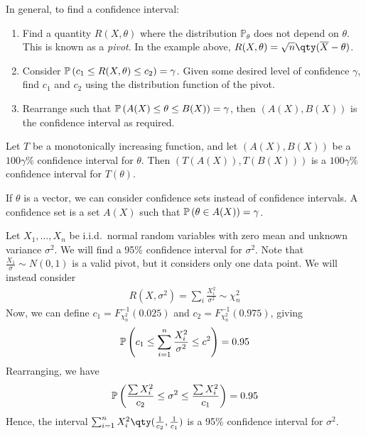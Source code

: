 \begin{remark}
	In general, to find a confidence interval:
	\begin{enumerate}
		\item Find a quantity $R(X,\theta)$ where the distribution $\mathbb P_\theta$ does not depend on $\theta$.
		      This is known as a \textit{pivot}.
		      In the example above, $R(X,\theta) = \sqrt{n}\qty(\overline X - \theta)$.
		\item Consider $\mathbb{P}\left({c_1 \leq R(X,\theta) \leq c_2}\right) = \gamma$.
		      Given some desired level of confidence $\gamma$, find $c_1$ and $c_2$ using the distribution function of the pivot.
		\item Rearrange such that $\mathbb{P}\left({A(X) \leq \theta \leq B(X)}\right) = \gamma$, then $(A(X), B(X))$ is the confidence interval as required.
	\end{enumerate}
\end{remark}
\begin{proposition}
	Let $T$ be a monotonically increasing function, and let $(A(X), B(X))$ be a $100 \gamma$\% confidence interval for $\theta$.
	Then $(T(A(X)), T(B(X)))$ is a $100 \gamma$\% confidence interval for $T(\theta)$.
\end{proposition}
\begin{remark}
	If $\theta$ is a vector, we can consider confidence sets instead of confidence intervals.
	A confidence set is a set $A(X)$ such that $\mathbb{P}\left({\theta \in A(X)}\right) = \gamma$.
\end{remark}
\begin{example}
	Let $X_1, \dots, X_n$ be i.i.d.\ normal random variables with zero mean and unknown variance $\sigma^2$.
	We will find a 95\% confidence interval for $\sigma^2$.
	Note that $\frac{X_1}{\sigma} \sim N(0,1)$ is a valid pivot, but it considers only one data point.
	We will instead consider
	\begin{align*}
		R(X, \sigma^2) = \sum_i \frac{X_i^2}{\sigma^2} \sim \chi^2_n
	\end{align*}
	Now, we can define $c_1 = F_{\chi^2_n}^{-1}(0.025)$ and $c_2 = F_{\chi^2_n}^{-1}(0.975)$, giving
	\begin{align*}
		\mathbb{P}\left({c_1 \leq \sum_{i=1}^n \frac{X_i^2}{\sigma^2} \leq c^2}\right) = 0.95
	\end{align*}
	Rearranging, we have
	\begin{align*}
		\mathbb{P}\left({\frac{\sum X_i^2}{c_2} \leq \sigma^2 \leq \frac{\sum X_i^2}{c_1}}\right) = 0.95
	\end{align*}
	Hence, the interval $\sum_{i=1}^n X_i^2 \qty(\frac{1}{c_2}, \frac{1}{c_1})$ is a 95\% confidence interval for $\sigma^2$.
\end{example}

